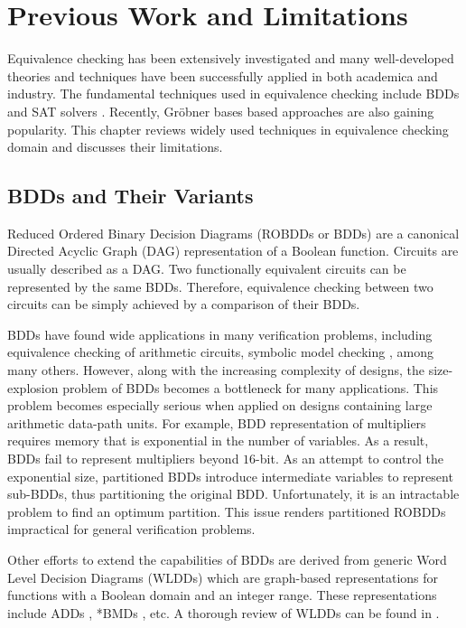 \chapter{Previous Work and Limitations}\label{ch:prev}


Equivalence checking has been extensively investigated  and many well-developed theories and techniques
have been successfully applied in both academica and industry.
The fundamental techniques used in equivalence checking include BDDs \cite{BRYA86} and SAT solvers \cite{dll}.
Recently, Gr\"obner bases based approaches are also gaining popularity.
This chapter reviews widely used techniques in equivalence checking domain and discusses their limitations.

\section{BDDs and Their Variants} 
Reduced Ordered Binary Decision Diagrams (ROBDDs or BDDs) are a canonical Directed Acyclic Graph (DAG)
representation of a Boolean function. Circuits are usually described as a DAG.
Two functionally equivalent circuits can be represented by the same BDDs. Therefore,
equivalence checking between two circuits can be simply achieved by a comparison of their BDDs.

BDDs have found wide applications in many verification problems, including equivalence checking of arithmetic circuits, 
symbolic model checking \cite{emerson_90} \cite{SMV}, among many others.  
However, along with the increasing complexity of designs, the size-explosion problem of 
BDDs becomes a bottleneck for many applications. 
This problem becomes especially serious when applied on designs containing large arithmetic data-path units.
For example, BDD representation of multipliers requires memory that is exponential in the number of
variables. As a result, BDDs fail to represent multipliers beyond $16$-bit.
As an attempt to control the exponential size, partitioned BDDs \cite{part_bdd}
introduce intermediate variables to represent sub-BDDs, thus partitioning the original BDD. 
Unfortunately, it is an intractable problem to find an optimum partition.
This issue renders partitioned ROBDDs impractical for general verification problems.
 
Other efforts to extend the capabilities of BDDs are derived from generic Word Level Decision
Diagrams (WLDDs) which are graph-based representations for functions with a Boolean
domain and an integer range. These representations include ADDs \cite{add},
 *BMDs \cite{bmd}, etc.  A thorough review of WLDDs can be found in \cite{WLS}.

